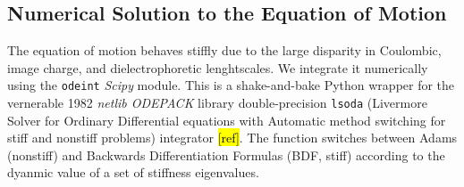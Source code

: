 \documentclass[10pt,a4paper]{article}
\begin{document}
\subsection{Numerical Solution to the Equation of Motion}
The equation of motion behaves stiffly due to the large disparity in Coulombic, image charge, and dielectrophoretic lenghtscales. We integrate it numerically using the \verb|odeint| \emph{Scipy} module. This is a shake-and-bake Python wrapper for the vernerable 1982 \emph{netlib ODEPACK} library double-precision \verb|lsoda| (Livermore Solver for Ordinary Differential equations with Automatic method switching for stiff and nonstiff problems) integrator \hl{[ref]}. The function switches between Adams (nonstiff) and Backwards Differentiation Formulas (BDF, stiff) according to the dyanmic value of a set of stiffness eigenvalues.
\end{document}
